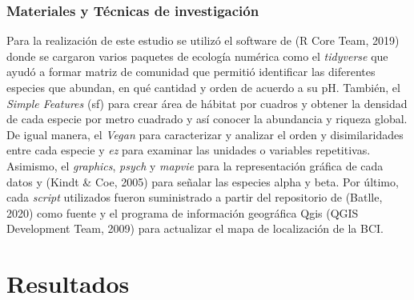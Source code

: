 \documentclass[11pt,]{article}
\begin{document}
\subsubsection{Materiales y Técnicas de
investigación}\label{materiales-y-tuxe9cnicas-de-investigaciuxf3n}

Para la realización de este estudio se utilizó el software de (R Core
Team, 2019) donde se cargaron varios paquetes de ecología numérica como
el \emph{tidyverse} que ayudó a formar matriz de comunidad que permitió
identificar las diferentes especies que abundan, en qué cantidad y orden
de acuerdo a su pH. También, el \emph{Simple Features} (sf) para crear
área de hábitat por cuadros y obtener la densidad de cada especie por
metro cuadrado y así conocer la abundancia y riqueza global. De igual
manera, el \emph{Vegan} para caracterizar y analizar el orden y
disimilaridades entre cada especie y \emph{ez} para examinar las
unidades o variables repetitivas. Asimismo, el \emph{graphics},
\emph{psych} y \emph{mapvie} para la representación gráfica de cada
datos y (Kindt \& Coe, 2005) para señalar las especies alpha y beta. Por
último, cada \emph{script} utilizados fueron suministrado a partir del
repositorio de (Batlle, 2020) como fuente y el programa de información
geográfica Qgis (QGIS Development Team, 2009) para actualizar el mapa de
localización de la BCI.

\section{Resultados}\label{resultados}
\end{document}
